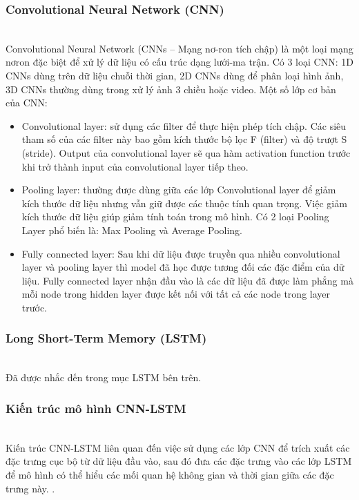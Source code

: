 \documentclass[conference]{IEEEtran}
\begin{document}
\subsubsection{Convolutional Neural Network (CNN)} \\
Convolutional Neural Network (CNNs – Mạng nơ-ron tích
chập) là một loại mạng nơron đặc biệt để xử lý dữ liệu có cấu trúc dạng lưới-ma trận. Có 3 loại CNN: 1D CNNs dùng trên dữ liệu chuỗi thời gian, 2D CNNs dùng để phân loại hình ảnh, 3D CNNs thường dùng trong xử lý ảnh 3 chiều hoặc video. 
Một số lớp cơ bản của CNN: 
\begin{itemize}
    \item Convolutional layer: sử dụng các filter để thực hiện phép tích chập. Các siêu tham số của các filter này bao gồm kích thước bộ lọc F (filter) và độ trượt S (stride). Output của convolutional layer sẽ qua hàm activation function trước khi trở thành input của convolutional layer tiếp theo. 
    \item Pooling layer: thường được dùng giữa các lớp Convolutional layer để giảm kích thước dữ liệu nhưng vẫn giữ được các thuộc tính quan trọng. Việc giảm kích thước dữ liệu giúp giảm tính toán trong mô hình. Có 2 loại Pooling Layer phổ biến là: Max Pooling và Average Pooling.
    \item Fully connected layer: Sau khi dữ liệu được truyền qua nhiều convolutional layer và pooling layer thì model đã học được tương đối các đặc điểm của dữ liệu. Fully connected layer nhận đầu vào là các dữ liệu đã được làm phẳng mà mỗi node trong hidden layer được kết nối với tất cả các node trong layer trước. 
\end{itemize}

\subsubsection{Long Short-Term Memory (LSTM)}\\
Đã được nhắc đến trong mục LSTM bên trên.

\subsubsection{Kiến trúc mô hình CNN-LSTM} \\
Kiến trúc CNN-LSTM liên quan đến việc sử dụng các lớp CNN để trích xuất các đặc trưng cục bộ từ dữ liệu đầu vào, sau đó đưa các đặc trưng vào các lớp LSTM để mô hình có thể hiểu các mối quan hệ không gian và thời gian giữa các đặc trưng này. \cite{predictStockCNNLSTM}.
\end{document}
